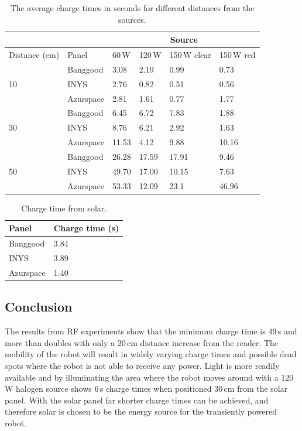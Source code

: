 \begin{table}[t]
	\centering
	\caption{The average charge times in seconds for different distances from the sources.}
	\label{tab:light_results}
	\begin{tabular}{|l|l||l|l|l|l|}
		\hline
		\multicolumn{2}{|c|}{} & \multicolumn{4}{|c|}{Source} \\
		\hline
		Distance (cm) & Panel & 60\,W & 120\,W & 150\,W clear & 150\,W red \\
		\hline \hline
		\multirow{3}{*}{10} & Banggood & 3.08 & 2.19 & 0.99 & 0.73 \\
		& INYS & 2.76 & 0.82 & 0.51 & 0.56 \\
		& Azurspace & 2.81 & 1.61 & 0.77 & 1.77 \\
		\hline
		\multirow{3}{*}{30} & Banggood & 6.45 & 6.72 & 7.83 & 1.88 \\
		& INYS & 8.76 & 6.21 & 2.92 & 1.63 \\
		& Azurspace& 11.53 & 4.12 & 9.88 & 10.16\\
		\hline
		\multirow{3}{*}{50} & Banggood & 26.28 & 17.59 & 17.91 & 9.46 \\
		& INYS & 49.70 & 17.00 & 10.15 & 7.63 \\
		& Azurspace & 53.33 & 12.09 & 23.1 & 46.96 \\
		\hline
	\end{tabular}
\end{table}

\begin{table}[t]
	\centering
	\caption{Charge time from solar.}
	\label{tab:solar_results}
	\begin{tabular}{|l|l|}
		\hline
		Panel & Charge time (s) \\
		\hline \hline
		Banggood & 3.84\\
		INYS & 3.89\\ 
		Azurspace & 1.40\\
		\hline
	\end{tabular}
\end{table}

\subsection{Conclusion}

The results from RF experiments show that the minimum charge time is 49\,s and more than doubles with only a 20\,cm distance increase from the reader.
The mobility of the robot will result in widely varying charge times and possible dead spots where the robot is not able to receive any power.
Light is more readily available and by illuminating the area where the robot moves around with a 120\,W halogen source shows 6\,s charge times when positioned 30\,cm from the solar panel.
With the solar panel far shorter charge times can be achieved, and therefore solar is chosen to be the energy source for the transiently powered robot.

